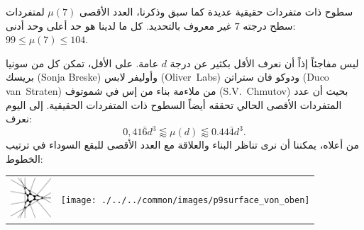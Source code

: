 \begin{surferPage}{سطوح ذات متفردات حقيقية عديدة}
كما سبق وذكرنا، العدد الأقصى $\mu(7)$ لمتفردات سطح درجته $7$ غير معروف بالتحديد. كل ما لدينا هو حد أعلى وحد أدنى: $99\le \mu(7) \le 104$.

   ليس مفاجئاً إذاً أن نعرف الأقل بكثير عن درجة  $d$ عامة.
    على الأقل، تمكن كل من سونيا بريسك
    \textenglish{(Sonja Breske)}
     وأوليفر لابس
      \textenglish{\mbox{(Oliver~Labs)}}
       ودوكو فان ستراتن
        \textenglish{(Duco van~Straten)}
         من ملاءمة بناء من إس في شموتوف
         \textenglish{(S.V.\ Chmutov)}
         بحيث أن عدد المتفردات الأقصى الحالي تحققه أيضاً السطوح ذات المتفردات الحقيقية.
    إلى اليوم نعرف:
    \[0,41\bar{6}d^3 \lessapprox \mu(d) \lessapprox 0.44\bar{4} d^3.\]
    من أعلاه، يمكننا أن نرى تناظر البناء والعلاقة مع العدد الأقصى للبقع السوداء في ترتيب الخطوط:
    \begin{center}
      \begin{tabular}{c@{\qquad}c}
        \includegraphics[height=1.5cm]{./../../common/images/vielesing.pdf}
        &
        \texttt{[image: ./../../common/images/p9surface\_von\_oben]}
      \end{tabular}
    \end{center}
\end{surferPage}
